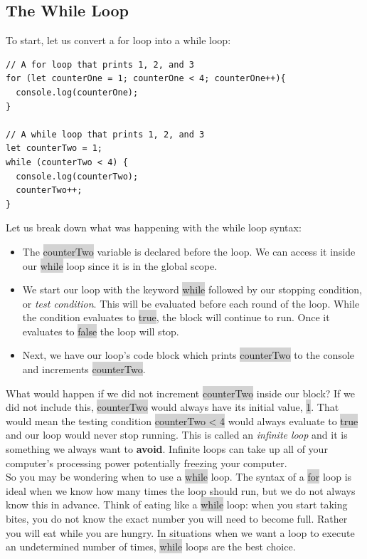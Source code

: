 \documentclass[11pt]{article}
\begin{document}
\subsection{The While Loop}
To start, let us convert a for loop into a while loop:
\begin{lstlisting}
// A for loop that prints 1, 2, and 3
for (let counterOne = 1; counterOne < 4; counterOne++){
  console.log(counterOne);
}

// A while loop that prints 1, 2, and 3
let counterTwo = 1;
while (counterTwo < 4) {
  console.log(counterTwo);
  counterTwo++;
}
\end{lstlisting}
Let us break down what was happening with the while loop syntax:
\begin{itemize}[leftmargin = *]
\item The \colorbox{lightgray}{counterTwo} variable is declared before the loop. We can access it inside our \colorbox{lightgray}{while} loop since it is in the global scope.
\item We start our loop with the keyword \colorbox{lightgray}{while} followed by our stopping condition, or \textit{test condition}. This will be evaluated before each round of the loop. While the condition evaluates to \colorbox{lightgray}{true}, the block will continue to run. Once it evaluates to \colorbox{lightgray}{false} the loop will stop.
\item Next, we have our loop’s code block which prints \colorbox{lightgray}{counterTwo} to the console and increments \colorbox{lightgray}{counterTwo}.
\end{itemize}
What would happen if we did not increment \colorbox{lightgray}{counterTwo} inside our block? If we did not include this, \colorbox{lightgray}{counterTwo} would always have its initial value, \colorbox{lightgray}{1}. That would mean the testing condition \colorbox{lightgray}{counterTwo < 4} would always evaluate to \colorbox{lightgray}{true} and our loop would never stop running. This is called an \textit{infinite loop} and it is something we always want to \textbf{avoid}. Infinite loops can take up all of your computer’s processing power potentially freezing your computer. \\
\newline
So you may be wondering when to use a \colorbox{lightgray}{while} loop. The syntax of a \colorbox{lightgray}{for} loop is ideal when we know how many times the loop should run, but we do not always know this in advance. Think of eating like a \colorbox{lightgray}{while} loop: when you start taking bites, you do not know the exact number you will need to become full. Rather you will eat while you are hungry. In situations when we want a loop to execute an undetermined number of times, \colorbox{lightgray}{while} loops are the best choice.
\end{document}
